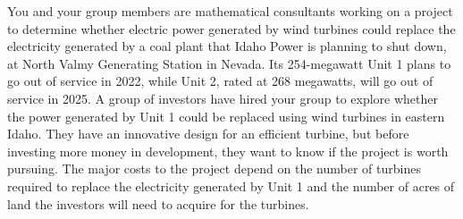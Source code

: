 \documentclass[11pt]{article}
\begin{document}
\begin{minipage}[t][2.6in]{0.65\textwidth}
    \vspace{0pt}

    You and your group members are mathematical consultants working on a
    project to determine whether electric power generated by wind turbines
    could replace the electricity generated by a coal plant that Idaho Power
    is planning to shut down, at North Valmy Generating Station in Nevada. Its
    254-megawatt Unit 1 plans to go
    out of service in 2022, while Unit 2, rated at 268 megawatts, will go out of
    service in 2025. A group of investors have hired your group to explore
    whether the power generated by Unit 1 could be replaced using
    wind turbines in eastern Idaho. They have an innovative design for an
    efficient turbine, but before investing more money in development, they
    want to know if the project is worth pursuing. The major costs to the
    project depend on the number of turbines required to replace the
    electricity generated by Unit 1 and the number of acres of land
    the investors will need to acquire for the turbines.




    \end{minipage} \hspace{1em}
\end{document}
